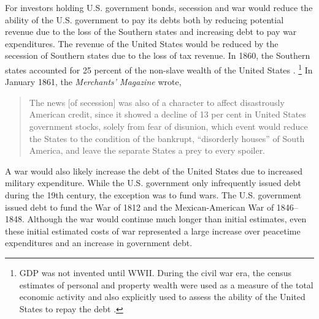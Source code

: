 For investors holding U.S. government bonds, secession and war would reduce the ability of the U.S. government to pay its debts both by reducing potential revenue due to the loss of the Southern states and increasing debt to pay war expenditures.
The revenue of the United States would be reduced by the secession of Southern states due to the loss of tax revenue. In 1860, the Southern states accounted for 25 percent of the non-slave wealth of the United States \parencite[11]{Elder1865}.%
\footnote{GDP was not invented until WWII.
  During the civil war era, the census estimates of personal and property wealth were used as a measure of the total economic activity and also explicitly used to assess the ability of the United States to repay the debt \parencites{Elder1863}{Elder1865}.
}
In January 1861, the \textit{Merchants' Magazine} wrote,
\begin{quote}
   The news [of secession] was also of a character to affect disastrously American credit, since it showed a decline of 13 per cent in United States government stocks, solely from fear of disunion, which event would reduce the States to the condition of the bankrupt, ``disorderly houses'' of South America, and leave the separate States a prey to every spoiler. \parencite[79]{HomansDana1861a}
\end{quote}
A war would also likely increase the debt of the United States due to increased military expenditure.
While the U.S. government only infrequently issued debt during the 19th century, the exception was to fund wars.
The U.S. government issued debt to fund the War of 1812 and the Mexican-American War of 1846--1848.
Although the war would continue much longer than initial estimates, even these initial estimated costs of war represented a large increase over peacetime expenditures and an increase in government debt.
